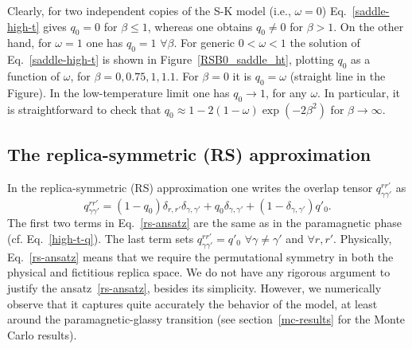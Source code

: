 \documentclass[twocolumn,superscriptaddress,prb,10pt]{revtex4-1}
\begin{document}
Clearly, for two independent copies of the S-K model (i.e., $\omega=0$) 
Eq.~\eqref{saddle-high-t} gives $q_0=0$ for $\beta\le1$, whereas 
one obtains $q_0\ne0$ for $\beta>1$. On the other hand, for $\omega=1$ 
one has $q_0=1$ $\forall\beta$. For generic $0<\omega<1$ the solution of 
Eq.~\eqref{saddle-high-t} is shown in Figure~\ref{RSB0_saddle_ht}, plotting 
$q_0$ as a function of $\omega$, for $\beta=0,0.75,1,1.1$. For $\beta=0$ it 
is $q_0=\omega$ (straight line in the Figure). In the low-temperature limit 
one has $q_0\to 1$, for any $\omega$. In particular, it is straightforward 
to check that  $q_0\approx 1-2(1-\omega)\exp(-2\beta^2)$ for $\beta\to\infty$. 


\subsection{The replica-symmetric (RS) approximation} 
\label{rs-section}

In the replica-symmetric (RS) approximation one writes the overlap tensor  
$q_{\gamma\gamma'}^{rr'}$ as
%
\begin{equation}
q_{\gamma\gamma'}^{rr'}=(1-q_0)\delta_{r,r'}\delta_{\gamma,\gamma'}+
q_0\delta_{\gamma,\gamma'}+(1-\delta_{\gamma,\gamma'})q'_0.
\label{rs-ansatz}
\end{equation}
%
The first two terms in Eq.~\eqref{rs-ansatz} are the same as in the paramagnetic 
phase (cf. Eq.~\eqref{high-t-q}). The last term sets $q_{\gamma\gamma'}^{rr'}=q'_0$ 
$\forall\gamma\ne\gamma'$ and $\forall r,r'$. Physically, Eq.~\eqref{rs-ansatz} 
means that we require the permutational symmetry in both the physical and fictitious 
replica space. We do not have any rigorous argument to justify the ansatz~\eqref{rs-ansatz}, 
besides its simplicity. However, we numerically observe that it captures quite accurately 
the behavior of the model, at least around the paramagnetic-glassy transition (see 
section~\ref{mc-results} for the Monte Carlo results). 
\end{document}
